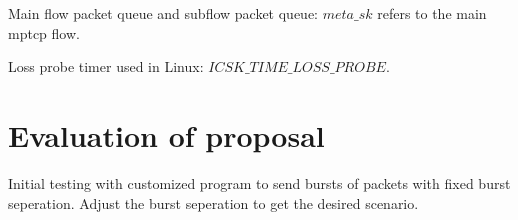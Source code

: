\documentclass[12pt,draftcls,onecolumn]{IEEEtran}
\begin{document}
Main flow packet queue and subflow packet queue: ${meta\_sk}$ refers to the
main mptcp flow.

Loss probe timer used in Linux: ${ICSK\_TIME\_LOSS\_PROBE}$.

\section{Evaluation of proposal}

Initial testing with customized program to send bursts of packets with fixed burst seperation. Adjust the burst seperation to get the desired scenario.







\end{document}
